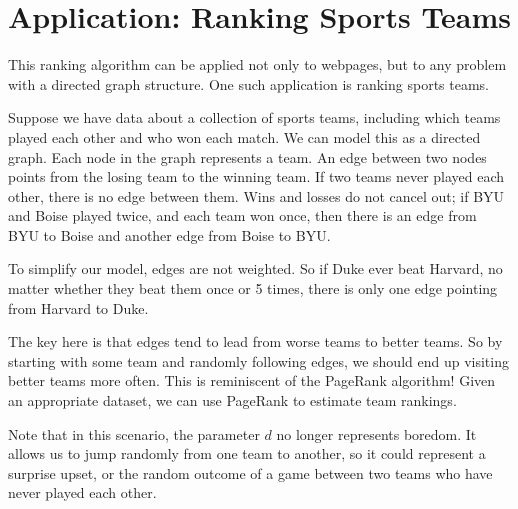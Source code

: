 \section*{Application: Ranking Sports Teams}
This ranking algorithm can be applied not only to webpages, but to any problem with a directed graph structure.
One such application is ranking sports teams.

Suppose we have data about a collection of sports teams, including which teams played each other and who won each match.
We can model this as a directed graph. Each node in the graph represents a team.
An edge between two nodes points from the losing team to the winning team.
If two teams never played each other, there is no edge between them.
Wins and losses do not cancel out; if BYU and Boise played twice, and each team won once, then there is an edge from BYU to Boise and another edge from Boise to BYU.

To simplify our model, edges are not weighted. So if Duke ever beat Harvard, no matter whether they beat them once or 5 times, there is only one edge pointing from Harvard to Duke.

The key here is that edges tend to lead from worse teams to better teams.
So by starting with some team and randomly following edges, we should end up visiting better teams more often.
This is reminiscent of the PageRank algorithm! Given an appropriate dataset, we can use PageRank to estimate team rankings.

Note that in this scenario, the parameter $d$ no longer represents boredom.
It allows us to jump randomly from one team to another, so it could represent a surprise upset, or the random outcome of a game between two teams who have never played each other.

